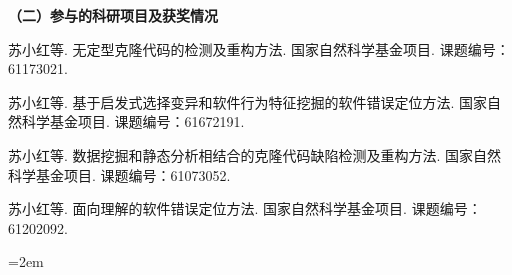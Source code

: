 


\noindent\textbf{（二）参与的科研项目及获奖情况}
\begin{publist}
\item	
苏小红等. 无定型克隆代码的检测及重构方法. 国家自然科学基金项目. 课题编号：61173021.
\item 
苏小红等. 基于启发式选择变异和软件行为特征挖掘的软件错误定位方法. 国家自然科学基金项目. 课题编号：61672191.
\item
苏小红等. 数据挖掘和静态分析相结合的克隆代码缺陷检测及重构方法. 国家自然科学基金项目. 课题编号：61073052.
\item
苏小红等. 面向理解的软件错误定位方法. 国家自然科学基金项目. 课题编号：61202092.

\end{publist}
\vfill
{}\hangindent=2em\noindent

\setlength{\parindent}{2em}
